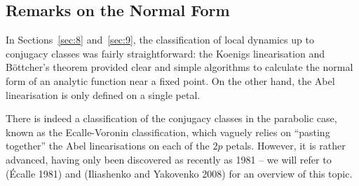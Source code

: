\documentclass[../main.tex]{subfiles}
\begin{document}
\subsection{Remarks on the Normal Form}

In Sections~\ref{sec:8} and~\ref{sec:9}, the classification of local dynamics up to conjugacy classes was fairly straightforward: the Koenigs linearisation and B\"ottcher's theorem provided clear and simple algorithms to calculate the normal form of an analytic function near a fixed point. On the other hand, the Abel linearisation is only defined on a single petal.

There is indeed a classification of the conjugacy classes in the parabolic case, known as the Ecalle-Voronin classification, which vaguely relies on ``pasting together'' the Abel linearisations on each of the $2p$ petals. However, it is rather advanced, having only been discovered as recently as 1981 -- we will refer to (\'Ecalle 1981) and (Iliashenko and Yakovenko 2008) for an overview of this topic.  
\end{document}

